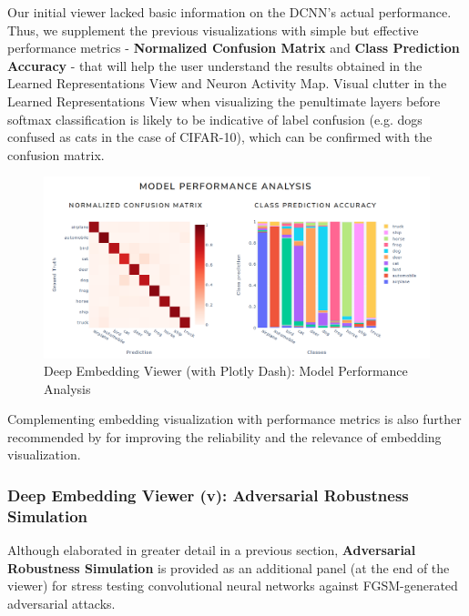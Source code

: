 Our initial viewer lacked basic information on the DCNN's actual performance. Thus, we supplement the previous visualizations with simple but effective performance metrics - \textbf{Normalized Confusion Matrix} and \textbf{Class Prediction Accuracy} - that will help the user understand the results obtained in the Learned Representations View and Neuron Activity Map. Visual clutter in the Learned Representations View when visualizing the penultimate layers before softmax classification is likely to be indicative of label confusion (e.g. dogs confused as cats in the case of CIFAR-10), which can be confirmed with the confusion matrix.




\vspace{0.2cm}

\begin{figure}[H]
	\centering
	\includegraphics[scale=0.55]{images/embedding_view/HRV_Fig_011_DEV_Metrics.PNG}
	\caption{Deep Embedding Viewer (with Plotly Dash): Model Performance Analysis}
	\label{fig:HRV_Fig_011_DEV_Metrics}
\end{figure}

\vspace{0.2cm}

Complementing embedding visualization with performance metrics is also further recommended by 
\cite{Rauber2017VisualizingTH} for improving the reliability and the relevance of embedding visualization.


\subsubsection{Deep Embedding Viewer (v): Adversarial Robustness Simulation}

Although elaborated in greater detail in a previous section, \textbf{Adversarial Robustness Simulation} is provided as an additional panel (at the end of the viewer) for stress testing convolutional neural networks against FGSM-generated adversarial attacks.

